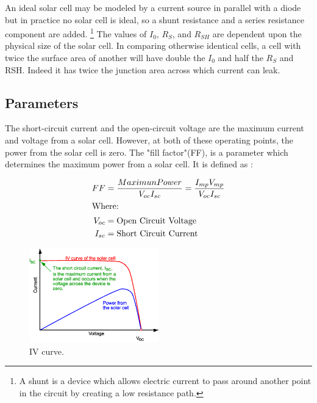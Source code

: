 \documentclass[11pt]{article} %
\begin{document}
An ideal solar cell may be modeled by a current source in parallel with a diode but in practice no solar cell is ideal, so a shunt resistance and a series resistance component are added. \footnote{A shunt is a device which allows  electric current  to pass around another point in the  circuit  by creating a low resistance path.} The values of $I_{0}$, $R_{S}$, and $R_{SH}$ are dependent upon the physical size of the solar cell. In comparing otherwise identical cells, a cell with twice the surface area of another will have double the $I_{0}$ and half the $R_{S}$ and RSH. Indeed it has twice the junction area across which current can leak.



\subsection{Parameters}

The short-circuit current and the open-circuit voltage are the maximum current and voltage from a solar cell. However, at both of these operating points, the power from the solar cell is zero. The "fill factor"(FF), is a parameter which determines the maximum power from a solar cell. It is defined as : 

\begin{align}
FF &= \frac{MaximunPower}{V_{oc}I_{sc}}  = \frac{I_{mp}V_{mp}}{V_{oc}I_{sc}} \\
\intertext{Where:}
V_{oc} &= \text{Open Circuit Voltage} \\
I_{sc} &= \text{Short Circuit Current} 
\end{align}

\begin{figure}
	\centering
	\includegraphics[width=0.5\textwidth]{img/IV-ISC.png}
	\caption{IV curve.}
\end{figure}


%
\end{document}
